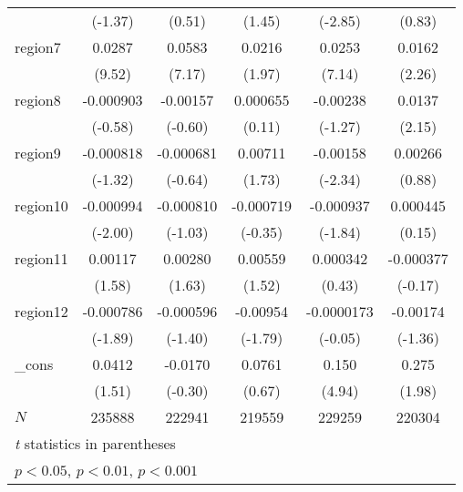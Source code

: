 \begin{table}[htbp]
\begin{tabular}{l*{5}{c}}
            &     (-1.37)         &      (0.51)         &      (1.45)         &     (-2.85)         &      (0.83)         \\
region7     &      0.0287\sym{***}&      0.0583\sym{***}&      0.0216\sym{*}  &      0.0253\sym{***}&      0.0162\sym{*}  \\
            &      (9.52)         &      (7.17)         &      (1.97)         &      (7.14)         &      (2.26)         \\
region8     &   -0.000903         &    -0.00157         &    0.000655         &    -0.00238         &      0.0137\sym{*}  \\
            &     (-0.58)         &     (-0.60)         &      (0.11)         &     (-1.27)         &      (2.15)         \\
region9     &   -0.000818         &   -0.000681         &     0.00711         &    -0.00158\sym{*}  &     0.00266         \\
            &     (-1.32)         &     (-0.64)         &      (1.73)         &     (-2.34)         &      (0.88)         \\
region10    &   -0.000994\sym{*}  &   -0.000810         &   -0.000719         &   -0.000937         &    0.000445         \\
            &     (-2.00)         &     (-1.03)         &     (-0.35)         &     (-1.84)         &      (0.15)         \\
region11    &     0.00117         &     0.00280         &     0.00559         &    0.000342         &   -0.000377         \\
            &      (1.58)         &      (1.63)         &      (1.52)         &      (0.43)         &     (-0.17)         \\
region12    &   -0.000786         &   -0.000596         &    -0.00954         &  -0.0000173         &    -0.00174         \\
            &     (-1.89)         &     (-1.40)         &     (-1.79)         &     (-0.05)         &     (-1.36)         \\
\_cons      &      0.0412         &     -0.0170         &      0.0761         &       0.150\sym{***}&       0.275\sym{*}  \\
            &      (1.51)         &     (-0.30)         &      (0.67)         &      (4.94)         &      (1.98)         \\
\hline
\(N\)       &      235888         &      222941         &      219559         &      229259         &      220304         \\
\hline\hline
\multicolumn{6}{l}{\footnotesize \textit{t} statistics in parentheses}\\
\multicolumn{6}{l}{\footnotesize \sym{*} \(p<0.05\), \sym{**} \(p<0.01\), \sym{***} \(p<0.001\)}\\
\end{tabular}
\label{tab:oaxaca_male_clustered}
\end{table}
